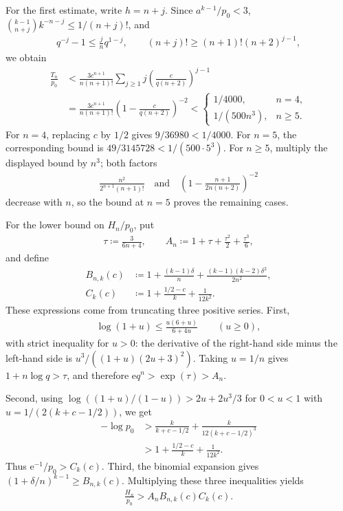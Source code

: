 For the first estimate, write $h=n+j$. Since $a^{k-1}/p_0<3$, $\binom{k-1}{n+j}k^{-n-j}\le1/(n+j)!$, and
\begin{align*}
q^{-j}-1\le\frac jn q^{1-j},\qquad
(n+j)!\ge(n+1)!(n+2)^{j-1},
\end{align*}
we obtain
\begin{align}\label{eq:appendix-tail-error}
\frac{T_n}{p_0}
&<\frac{3c^{n+1}}{n(n+1)!}
\sum_{j\ge1}j\left(\frac{c}{q(n+2)}\right)^{j-1}\nonumber\\
&=\frac{3c^{n+1}}{n(n+1)!}
\left(1-\frac{c}{q(n+2)}\right)^{-2}
<\begin{cases}
1/4000,&n=4,\\
1/(500n^3),&n\ge5.
\end{cases}
\end{align}
For $n=4$, replacing $c$ by $1/2$ gives $9/36980<1/4000$. For $n=5$, the corresponding bound is $49/3145728<1/(500\cdot5^3)$. For $n\ge5$, multiply the displayed bound by $n^3$; both factors
\begin{align*}
\frac{n^2}{2^{n+1}(n+1)!}
\quad\text{and}\quad
\left(1-\frac{n+1}{2n(n+2)}\right)^{-2}
\end{align*}
decrease with $n$, so the bound at $n=5$ proves the remaining cases.

For the lower bound on $H_n/p_0$, put
\begin{align*}
\tau\coloneqq\frac3{6n+4},\qquad
A_n\coloneqq1+\tau+\frac{\tau^2}{2}+\frac{\tau^3}{6},
\end{align*}
and define
\begin{align*}
B_{n,k}(c)&\coloneqq1+\frac{(k-1)\delta}{n}
+\frac{(k-1)(k-2)\delta^2}{2n^2},\\
C_k(c)&\coloneqq1+\frac{1/2-c}{k}+\frac1{12k^2}.
\end{align*}
These expressions come from truncating three positive series. First,
\begin{align*}
\log(1+u)\le\frac{u(6+u)}{6+4u}\qquad(u\ge0),
\end{align*}
with strict inequality for $u>0$: the derivative of the right-hand side minus the left-hand side is $u^3/((1+u)(2u+3)^2)$. Taking $u=1/n$ gives $1+n\log q>\tau$, and therefore $\mathrm e q^n>\exp(\tau)>A_n$.

Second, using $\log((1+u)/(1-u))>2u+2u^3/3$ for $0<u<1$ with $u=1/(2(k+c-1/2))$, we get
\begin{align*}
-\log p_0
&>\frac{k}{k+c-1/2}+\frac{k}{12(k+c-1/2)^3}\\
&>1+\frac{1/2-c}{k}+\frac1{12k^2}.
\end{align*}
Thus $\mathrm e^{-1}/p_0>C_k(c)$. Third, the binomial expansion gives $(1+\delta/n)^{k-1}\ge B_{n,k}(c)$. Multiplying these three inequalities yields
\begin{align}\label{eq:appendix-rational-lower-bound}
\frac{H_n}{p_0}>A_nB_{n,k}(c)C_k(c).
\end{align}

